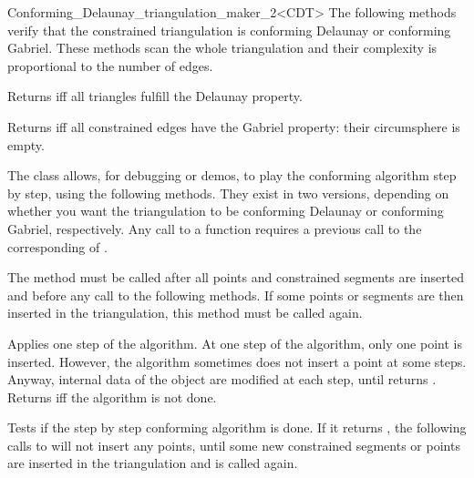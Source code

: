 \begin{ccRefClass}{Conforming_Delaunay_triangulation_maker_2<CDT>}
The following methods verify that the constrained triangulation is
conforming Delaunay or conforming Gabriel. These methods scan the
whole triangulation and their complexity is proportional to the number
of edges.

{ Returns  iff all triangles fulfill the Delaunay property.}

{ Returns  iff all constrained edges have the Gabriel property:
  their circumsphere is empty. }

\begin{ccAdvanced}


The \ccRefName{} class allows, for debugging or demos, to play the
conforming algorithm step by step, using the following methods. They
exist in two versions, depending on whether you want the triangulation to
be conforming Delaunay or conforming Gabriel, respectively. Any call to a
 function requires a previous call to
the corresponding of .

{ The method must be called after all points and constrained segments
  are inserted and before any call to the following methods. If some
  points or segments are then inserted in the triangulation, this
  method must be called again. }

{ Applies one step of the algorithm. At one step of the algorithm,
  only one point is inserted. However, the algorithm sometimes does not
  insert a point at some steps. Anyway, internal data of the \ccRefName{}
  object are modified at each step, until 
  returns . Returns  iff the algorithm is not done.}



{ Tests if the step by step conforming algorithm is done. If it
  returns , the following calls to
   will not insert any points, until some
  new constrained segments or points are inserted in the triangulation and
   is called again. }

\end{ccAdvanced}

\end{ccRefClass}

